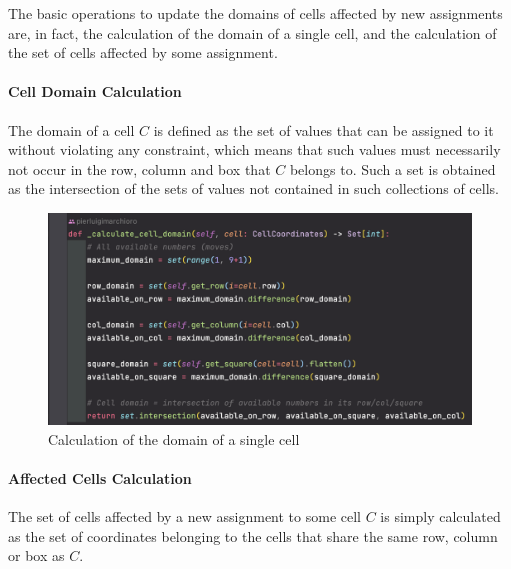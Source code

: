 The basic operations to update the domains of cells affected by new assignments are, in fact, the calculation of the domain of a single cell, and the calculation of the set of cells affected by some assignment.

\paragraph{Cell Domain Calculation} The domain of a cell $C$ is defined as the set of values that can be assigned to it without violating any constraint, which means that such values must necessarily not occur in the row, column and box that $C$ belongs to. Such a set is obtained as the intersection of the sets of values not contained in such collections of cells.

\begin{figure}[h]
    \centering
    \includegraphics[scale=0.65]{assignment-1/images/cp/domains-2-calc-cell-dom.png}
    \caption{Calculation of the domain of a single cell}
    \label{fig:domain_2}
\end{figure}

\paragraph{Affected Cells Calculation} The set of cells affected by a new assignment to some cell $C$ is simply calculated as the set of coordinates belonging to the cells that share the same row, column or box as $C$.

